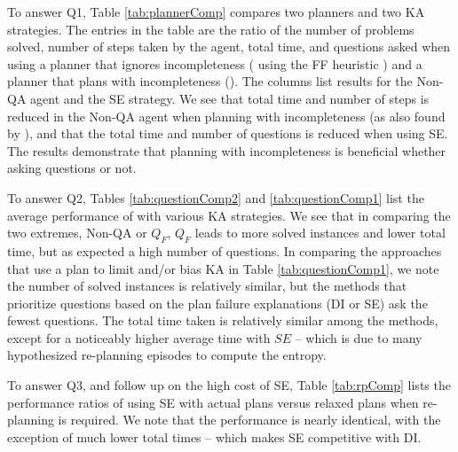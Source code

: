\documentclass{article}
\begin{document}
 To answer Q1, Table \ref{tab:plannerComp} compares two planners
and two KA strategies.  The entries in the table are the ratio of
the number of problems solved, number of steps taken by the agent, total time,
and questions asked when using a planner that ignores incompleteness
( using the FF heuristic \citep{hoffmann:nebel:jair-01}) and a planner
that plans with incompleteness ().  The columns list results for the
Non-QA agent and the SE strategy.  We see that total time and number of steps is
reduced in the Non-QA agent when planning with incompleteness (as also found by
\citet{bryce-icaps11}), and that the total time and number of questions is
reduced when using SE.  The
results demonstrate that planning with incompleteness is beneficial whether
asking questions or not.

To answer Q2, Tables \ref{tab:questionComp2} and \ref{tab:questionComp1} list
the average performance of  with various KA strategies.
We see that in comparing the two extremes, Non-QA or $Q_F$, $Q_F$ leads to more
solved instances and lower total time, but as expected a high number of
questions.  In comparing the approaches that use a plan to limit and/or bias
KA in Table \ref{tab:questionComp1}, we note the number of solved
instances is relatively similar, but the methods that prioritize questions based
on the plan failure explanations (DI or SE) ask the fewest questions.  The total
time taken is relatively similar among the methods, except for a noticeably higher average
time with $SE$ -- which is due to many hypothesized re-planning
episodes to compute the entropy.

To answer Q3, and follow up on the high cost of SE, Table \ref{tab:rpComp} lists
the performance ratios of using SE with actual plans versus relaxed plans when
re-planning is required.  We note that the performance is nearly identical, with
the exception of much lower total times -- which makes SE
competitive with DI.



\end{document}
